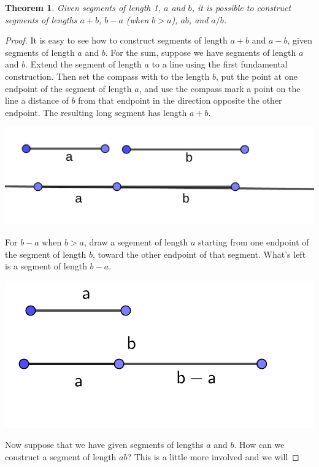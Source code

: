 \documentclass[11pt]{article}
\newtheorem{theorem}{Theorem}[section]
\theoremstyle{definition}
\begin{document}
\begin{theorem}
  Given segments of length 1, $a$ and $b$, it is possible to construct segments of lengths $a+b$, $b-a$ (when $b>a$), $ab$, and $a/b$.
  \label{theorem: rational constructions}
\end{theorem}
\begin{proof}
  It is easy to see how to construct segments of length $a+b$ and $a-b$, given segments of length $a$ and $b$. For the sum, suppose we have segments of 
  length $a$ and $b$. Extend the segment of length $a$ to a line using the first fundamental construction. Then set the compass with to the length $b$,
  put the point at one endpoint of the segment of length $a$, and use the compass mark a point on the line a distance of $b$ from that endpoint in the direction
  opposite the other endpoint. The resulting long segment has length $a+b$.
  \begin{center}
    \includegraphics[scale=.1]{Images/a_plus_b.png}
  \end{center}
  For $b-a$ when $b>a$, draw a segement of length $a$ starting from one endpoint of the segment of length $b$, toward the other endpoint of that 
  segment. What's left is a segment of length $b-a$.
  \begin{center}
    \includegraphics[scale=.1]{Images/b_minus_a.png}
  \end{center}
  Now suppose that we have given segments of lengths $a$ and $b$. How can we construct a segment of length $ab$? This is a little more involved and we will

\end{proof}
\end{document}
